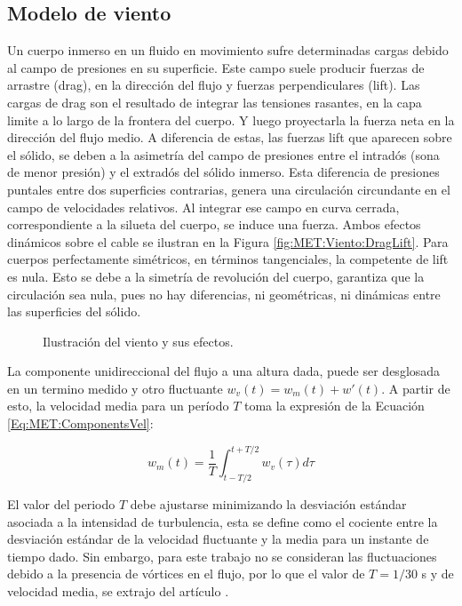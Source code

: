 \subsection{Modelo de viento}\label{Sec:PRE:Modeloviento}
Un cuerpo inmerso en un fluido en movimiento sufre determinadas cargas debido al campo de presiones en su superficie. Este campo suele producir fuerzas de arrastre (drag), en la dirección del flujo y fuerzas perpendiculares (lift). Las cargas de drag son el resultado de integrar las tensiones rasantes, en la capa limite a lo largo de la frontera del cuerpo. Y luego proyectarla la fuerza neta en la dirección del flujo medio. A diferencia de estas, las fuerzas lift que aparecen sobre el sólido, se deben a la asimetría del campo de presiones entre el intradós (sona de menor presión) y el extradós del sólido inmerso. Esta diferencia de presiones puntales entre dos superficies contrarias, genera una circulación circundante en el campo de velocidades relativos. Al integrar ese campo en curva cerrada, correspondiente a la silueta del cuerpo, se induce una fuerza. Ambos efectos dinámicos sobre el cable se ilustran en la Figura \ref{fig:MET:Viento:DragLift}. Para cuerpos perfectamente simétricos, en términos tangenciales, la competente de lift es nula.  Esto se debe a la simetría de revolución del cuerpo, garantiza que la circulación sea nula, pues no hay diferencias, ni geométricas, ni dinámicas entre las superficies del sólido. 


\begingroup
\begin{figure}[htbp]
	\centering
	\label{fig:MET:Viento:EsqViento}
	\label{fig:MET:Viento:DragLift}
	\caption{Ilustración del viento y sus efectos.} 	\label{fig:Met:Viento:Esquemas}
\end{figure}
\endgroup

La componente unidireccional del flujo a una altura dada, puede ser desglosada en un termino medido y otro fluctuante $w_v(t)=w_m(t)+{w}'(t)$. A partir de esto, la velocidad media para un período $T$ toma la expresión de la Ecuación \eqref{Eq:MET:ComponentsVel}:


\begin{equation}\label{Eq:MET:ComponentsVel}
	w_m(t)=\frac{1}{T}\int_{t-T/2}^{t+T/2}w_v(\tau)d\tau
\end{equation}


El valor del periodo $T$ debe ajustarse minimizando la desviación estándar asociada a la intensidad de turbulencia, esta se define como el cociente entre la desviación estándar de la velocidad fluctuante y la media para un instante de tiempo dado. Sin embargo, para este trabajo no se consideran las fluctuaciones debido a la presencia de vórtices en el flujo, por lo que el valor de $T=1/30$ s y de velocidad media, se extrajo del artículo \citep{stengel2017measurements}.

